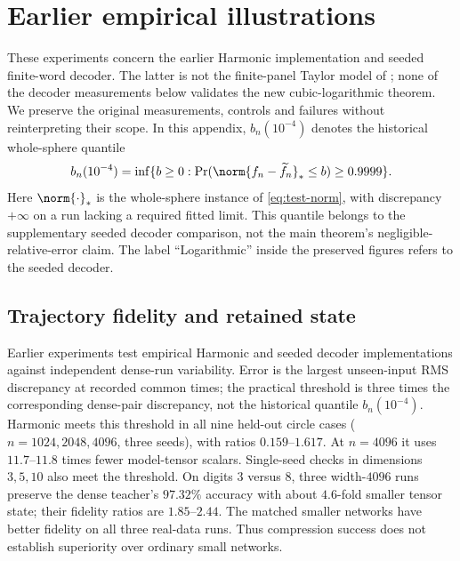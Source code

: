 \section{Earlier empirical illustrations}\label{app:earlier-illustrations}
These experiments concern the earlier Harmonic implementation and seeded
finite-word decoder. The latter is not the finite-panel Taylor model
of ; none of the decoder measurements below validates
the new cubic-logarithmic theorem. We preserve the original measurements,
controls and failures without reinterpreting their scope. In this appendix,
$b_n(10^{-4})$ denotes the historical whole-sphere quantile
\begin{equation}
 b_n(10^{-4})=\inf\{b\ge0:\Pr(\norm{f_n-\widetilde f_n}_*\le b)\ge0.9999\}.
 \label{eq:intrinsic-benchmark}
\end{equation}
Here $\norm{\cdot}_*$ is the whole-sphere instance of
\eqref{eq:test-norm}, with discrepancy $+\infty$ on a run lacking a
required fitted limit. This quantile belongs to the supplementary seeded
decoder comparison, not the main theorem's negligible-relative-error claim.
The label
``Logarithmic'' inside the preserved figures refers to the seeded decoder.

\subsection{Trajectory fidelity and retained state}
\label{sec:experiments}
Earlier experiments test empirical Harmonic and seeded decoder implementations
against independent dense-run variability. Error is the largest unseen-input
RMS discrepancy at recorded common times; the practical threshold is three
times the corresponding dense-pair discrepancy, not the historical quantile
$b_n(10^{-4})$. Harmonic meets this threshold in all nine held-out circle cases
($n=1024,2048,4096$, three seeds), with ratios $0.159$--$1.617$.
At $n=4096$ it uses $11.7$--$11.8$ times fewer model-tensor scalars.
Single-seed checks in dimensions $3,5,10$ also meet the threshold.
On digits $3$ versus $8$, three width-$4096$ runs preserve the dense
teacher's $97.32\%$ accuracy with about $4.6$-fold smaller tensor state;
their fidelity ratios are $1.85$--$2.44$. The matched smaller networks
have better fidelity on all three real-data runs. Thus compression
success does not establish superiority over ordinary small networks.

